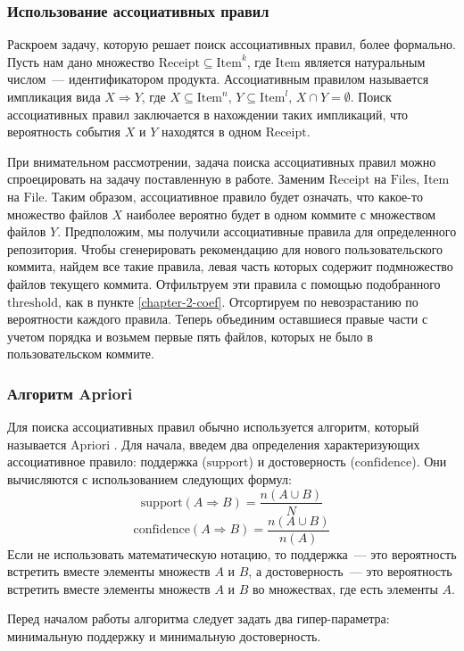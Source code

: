     \subsubsection{Использование ассоциативных правил}
Раскроем задачу, которую решает поиск ассоциативных правил, более формально. Пусть нам дано множество $\text{Receipt} \subseteq \text{Item}^k$, где $\text{Item}$ является натуральным числом~--- идентификатором продукта. Ассоциативным правилом называется импликация вида $X \Rightarrow Y$, где $X \subseteq \text{Item}^n$, $Y \subseteq \text{Item}^l$, $X \cap Y = \emptyset$. Поиск ассоциативных правил заключается в нахождении таких импликаций, что вероятность события $X$ и $Y$ находятся в одном $\text{Receipt}$. 

При внимательном рассмотрении, задача поиска ассоциативных правил можно спроецировать на задачу поставленную в работе. Заменим $\text{Receipt}$ на $\text{Files}$, $\text{Item}$ на $\text{File}$. Таким образом, ассоциативное правило будет означать, что какое-то множество файлов $X$ наиболее вероятно будет в одном коммите с множеством файлов $Y$. Предположим, мы получили ассоциативные правила для определенного репозитория. Чтобы сгенерировать рекомендацию для нового пользовательского коммита, найдем все такие правила, левая часть которых содержит подмножество файлов текущего коммита. Отфильтруем эти правила с помощью подобранного $\text{threshold}$, как в пункте \ref{chapter-2-coef}. Отсортируем по невозрастанию по вероятности каждого правила. Теперь объединим оставшиеся правые части с учетом порядка и возьмем первые пять файлов, которых не было в пользовательском коммите.
        \subsubsection{Алгоритм Apriori}\label{chapter2-apriori}
Для поиска ассоциативных правил обычно используется алгоритм, который называется Apriori \cite{apriori}. Для начала, введем два определения характеризующих ассоциативное правило: поддержка ($\text{support}$) и достоверность ($\text{confidence}$). Они вычисляются с использованием следующих формул:
    $$\text{support}(A \Rightarrow B) = \frac{n(A \cup B)}{N}$$
    $$\text{confidence}(A \Rightarrow B) = \frac{n(A \cup B)}{n(A)}$$
Если не использовать математическую нотацию, то поддержка~--- это вероятность встретить вместе элементы множеств $A$ и $B$, а достоверность~--- это вероятность встретить вместе элементы множеств $A$ и $B$ во множествах, где есть элементы $A$.

Перед началом работы алгоритма следует задать два гипер-параметра: минимальную поддержку и минимальную достоверность. 

